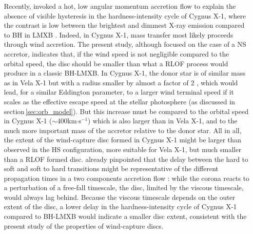 \documentclass{aa}
\makeatletter
\newcommand*{\rlof}{RLOF\@\xspace}
\newcommand*{\ns}{NS\@\xspace}
\makeatother
\begin{document}
Recently, \cite{Taam2018} invoked a hot, low angular momentum accretion flow to explain the absence of visible hysteresis in the hardness-intensity cycle of Cygnus X-1, where the contrast is low between the brightest and dimmest X-ray emission compared to BH in LMXB \citep{Grinberg:2014ux}. Indeed, in Cygnus X-1, mass transfer most likely proceeds through wind accretion. The present study, although focused on the case of a \ns accretor, indicates that, if the wind speed is not negligible compared to the orbital speed, the disc should be smaller than what a \rlof process would produce in a classic BH-LMXB. In Cygnus X-1, the donor star is of similar mass as in Vela X-1 but with a radius smaller by almost a factor of 2 \citep{Orosz2011}, which would lead, for a similar Eddington parameter, to a larger wind terminal speed if it scales as the effective escape speed at the stellar photosphere (as discussed in section\,\ref{sec:orb_model}). But this increase must be compared to the orbital speed in Cygnus X-1 ($\sim$400km$\cdot$s$^{-1}$) which is also larger than in Vela X-1, and to the much more important mass of the accretor relative to the donor star. All in all, the extent of the wind-capture disc formed in Cygnus X-1 might be larger than observed in the HS configuration, more suitable for Vela X-1, but much smaller than a \rlof formed disc. \cite{Smith2001} already pinpointed that the delay between the hard to soft and soft to hard transitions might be representative of the different propagation times in a two components accretion flow : while the corona reacts to a perturbation of a free-fall timescale, the disc, limited by the viscous timescale, would always lag behind. Because the viscous timescale depends on the outer extent of the disc, a lower delay in the hardness-intensity cycle of Cygnus X-1 compared to BH-LMXB would indicate a smaller disc extent, consistent with the present study of the properties of wind-capture discs.
\end{document}
